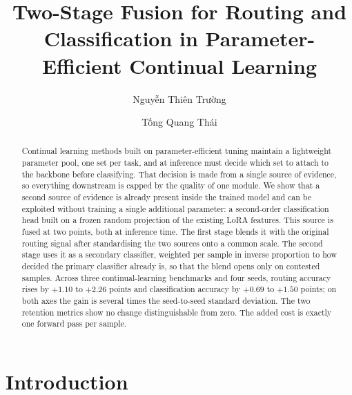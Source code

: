 \documentclass[runningheads]{llncs}
\begin{document}
%
%
\title{Two-Stage Fusion for Routing and Classification in
Parameter-Efficient Continual Learning}
%
%
\author{Nguyễn Thiên Trường \and Tống Quang Thái}
%
%
%
\maketitle
%
\begin{abstract}
Continual learning methods built on parameter-efficient tuning maintain a
lightweight parameter pool, one set per task, and at inference must decide which
set to attach to the backbone before classifying. That decision is made from a
single source of evidence, so everything downstream is capped by the quality of
one module. We show that a second source of evidence is already present inside
the trained model and can be exploited without training a single additional
parameter: a second-order classification head built on a frozen random
projection of the existing LoRA features. This source is fused at two points,
both at inference time. The first stage blends it with the original routing
signal after standardising the two sources onto a common scale. The second stage
uses it as a secondary classifier, weighted per sample in inverse proportion to
how decided the primary classifier already is, so that the blend opens only on
contested samples. Across three continual-learning benchmarks and four seeds,
routing accuracy rises by $+1.10$ to $+2.26$ points and classification accuracy
by $+0.69$ to $+1.50$ points; on both axes the gain is several times the
seed-to-seed standard deviation. The two retention metrics show no change
distinguishable from zero. The added cost is exactly one forward pass per
sample.

\end{abstract}
%
%
%
\section{Introduction}
\end{document}
